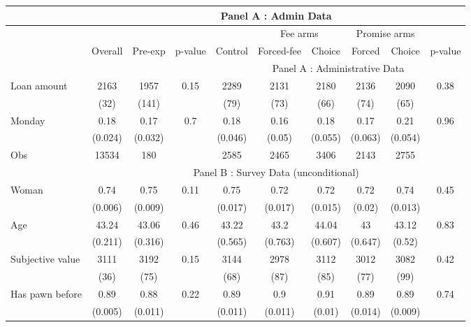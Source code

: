 \begin{tabular}{lccccccccc}
\toprule
      & \multicolumn{9}{c}{Panel A : Admin Data } \\
\midrule
      &       &       &       &       & \multicolumn{2}{c}{Fee arms} & \multicolumn{2}{c}{Promise arms} &  \\
\midrule
\midrule
      & \multicolumn{1}{p{3.5em}}{Overall} & \multicolumn{1}{p{3.5em}}{Pre-exp} & \multicolumn{1}{p{3.365em}}{p-value} & \multicolumn{1}{p{3.275em}}{Control} & \multicolumn{1}{p{4.955em}}{Forced-fee} & \multicolumn{1}{p{3.5em}}{Choice} & \multicolumn{1}{p{4.045em}}{Forced} & \multicolumn{1}{p{4.045em}}{Choice } & \multicolumn{1}{p{3.275em}}{p-value} \\
\midrule
      &       &       &       & \multicolumn{6}{c}{Panel A : Administrative Data} \\
\midrule
\midrule
Loan amount  & 2163  & 1957  & 0.15  & 2289  & 2131  & 2180  & 2136  & 2090  & 0.38 \\
      & (32)  & (141) &       & (79)  & (73)  & (66)  & (74)  & (65)  &  \\
Monday & 0.18  & 0.17  & 0.7   & 0.18  & 0.16  & 0.18  & 0.17  & 0.21  & 0.96 \\
      & (0.024) & (0.032) &       & (0.046) & (0.05) & (0.055) & (0.063) & (0.054) &  \\
\midrule
Obs   & 13534 & 180   &       & 2585  & 2465  & 3406  & 2143  & 2755  &  \\
\midrule
      & \multicolumn{9}{c}{Panel B : Survey Data (unconditional)} \\
\midrule
Woman & 0.74  & 0.75  & 0.11  & 0.75  & 0.72  & 0.72  & 0.72  & 0.74  & 0.45 \\
      & (0.006) & (0.009) &       & (0.017) & (0.017) & (0.015) & (0.02) & (0.013) &  \\
Age   & 43.24 & 43.06 & 0.46  & 43.22 & 43.2  & 44.04 & 43    & 43.12 & 0.83 \\
      & (0.211) & (0.316) &       & (0.565) & (0.763) & (0.607) & (0.647) & (0.52) &  \\
Subjective value & 3111  & 3192  & 0.15  & 3144  & 2978  & 3112  & 3012  & 3082  & 0.42 \\
      & (36)  & (75)  &       & (68)  & (87)  & (85)  & (77)  & (99)  &  \\
Has pawn before & 0.89  & 0.88  & 0.22  & 0.89  & 0.9   & 0.91  & 0.89  & 0.89  & 0.74 \\
      & (0.005) & (0.011) &       & (0.011) & (0.011) & (0.01) & (0.014) & (0.009) &  \\

\end{tabular}
